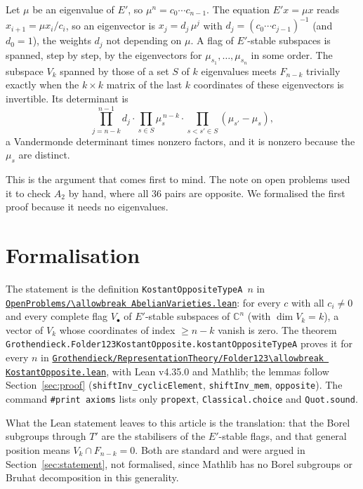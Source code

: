 \documentclass[11pt,a4paper]{amsart}
\theoremstyle{definition}
\theoremstyle{remark}
\newcommand{\C}{\mathbb C}
\newcommand{\leanrepo}{https://github.com/Commutator-IO/GrothendieckArchivesProofs/blob/main}
\begin{document}
Let $\mu$ be an eigenvalue of $E'$, so $\mu^n = c_0\cdots c_{n-1}$. The equation $E'x = \mu x$ reads $x_{i+1} = \mu x_i / c_i$, so an eigenvector is $x_j = d_j\,\mu^j$ with $d_j = (c_0\cdots c_{j-1})^{-1}$ (and $d_0 = 1$), the weights $d_j$ not depending on $\mu$. A flag of $E'$-stable subspaces is spanned, step by step, by the eigenvectors for $\mu_{s_1},\dots,\mu_{s_n}$ in some order. The subspace $V_k$ spanned by those of a set $S$ of $k$ eigenvalues meets $F_{n-k}$ trivially exactly when the $k \times k$ matrix of the last $k$ coordinates of these eigenvectors is invertible. Its determinant is
\[
\prod_{j=n-k}^{n-1} d_j \cdot \prod_{s \in S}\mu_s^{\,n-k} \cdot \prod_{s<s' \in S}(\mu_{s'}-\mu_s),
\]
a Vandermonde determinant times nonzero factors, and it is nonzero because the $\mu_s$ are distinct.

This is the argument that comes first to mind. The note on open problems used it to check $A_2$ by hand, where all $36$ pairs are opposite. We formalised the first proof because it needs no eigenvalues.

\section{Formalisation}\label{sec:lean}

The statement is the definition \texttt{KostantOppositeTypeA}~$n$ in \href{\leanrepo/OpenProblems/AbelianVarieties.lean}{\nolinkurl{OpenProblems/\allowbreak AbelianVarieties.lean}}: for every $c$ with all $c_i \neq 0$ and every complete flag $V_\bullet$ of $E'$-stable subspaces of $\C^n$ (with $\dim V_k = k$), a vector of $V_k$ whose coordinates of index $\geq n-k$ vanish is zero. The theorem \texttt{Grothendieck.\allowbreak Folder123Kostant\allowbreak Opposite.\allowbreak kostantOppositeTypeA} proves it for every $n$ in \href{\leanrepo/Grothendieck/RepresentationTheory/Folder123KostantOpposite.lean}{\nolinkurl{Grothendieck/RepresentationTheory/Folder123\allowbreak KostantOpposite.lean}}, with Lean v4.35.0 and Mathlib; the lemmas follow Section~\ref{sec:proof} (\texttt{shiftInv\_\allowbreak cyclicElement}, \texttt{shiftInv\_\allowbreak mem}, \texttt{opposite}). The command \texttt{\#print axioms} lists only \texttt{propext}, \texttt{Classical.choice} and \texttt{Quot.sound}.

What the Lean statement leaves to this article is the translation: that the Borel subgroups through $T'$ are the stabilisers of the $E'$-stable flags, and that general position means $V_k \cap F_{n-k} = 0$. Both are standard and were argued in Section~\ref{sec:statement}, not formalised, since Mathlib has no Borel subgroups or Bruhat decomposition in this generality.
\end{document}
